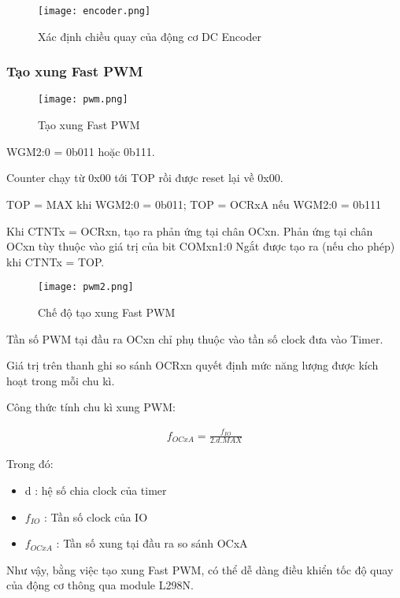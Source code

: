 \begin{figure}[h!]
	\centering
	\texttt{[image: encoder.png]}
	\caption[Xác định chiều quay của động cơ DC Encoder]{Xác định chiều quay của động cơ DC Encoder}
	\label{fig:Xác định chiều quay của động cơ DC Encoder}
\end{figure}
\newpage
\subsubsection{Tạo xung Fast PWM}

\begin{figure}[h!]
	\centering
	\texttt{[image: pwm.png]}
	\caption[Tạo xung Fast PWM]{Tạo xung Fast PWM}
	\label{fig:Tạo xung Fast PWM}
\end{figure}

WGM2:0 = 0b011 hoặc 0b111.

Counter chạy từ 0x00 tới TOP rồi được reset lại về 0x00. 

TOP = MAX khi WGM2:0 = 0b011; TOP = OCRxA nếu WGM2:0 = 0b111 

Khi CTNTx = OCRxn, tạo ra phản ứng tại chân OCxn. Phản ứng tại chân OCxn tùy thuộc vào giá trị của bit COMxn1:0
\newpage
Ngắt được tạo ra (nếu cho phép) khi CTNTx  = TOP.

\begin{figure}[h!]
	\centering
	\texttt{[image: pwm2.png]}
	\caption[Chế độ trong tạo xung Fast PWM]{Chế độ tạo xung Fast PWM}
	\label{fig:Chế độ tạo xung Fast PWM}
\end{figure}

Tần số PWM tại đầu ra OCxn chỉ phụ thuộc vào tần số clock đưa vào Timer.

Giá trị trên thanh ghi so sánh OCRxn quyết định mức năng lượng được kích hoạt trong mỗi chu kì. 

Công thức tính chu kì xung PWM: 

\begin{align}
	f_{OCxA} = \frac{f_{IO}}{2.d.MAX}
\end{align}

Trong đó:
\begin{itemize}
	
	\item d : hệ số chia clock của timer
	\item $f_{IO}$ : Tần số clock của IO
	\item $f_{OCxA}$ : Tần số xung tại đầu ra so sánh OCxA
	
\end{itemize}
\newpage
Như vậy, bằng việc tạo xung Fast PWM, có thể dễ dàng điều khiển tốc độ quay của động cơ thông qua module L298N.

